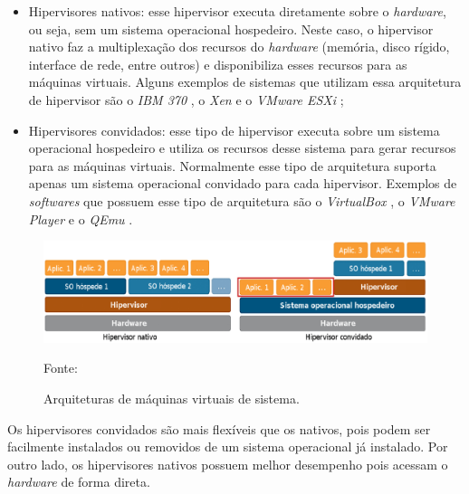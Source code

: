 \begin{itemize}
 \item Hipervisores nativos: esse hipervisor executa diretamente sobre o \textit{hardware}, ou seja, sem um sistema operacional
 hospedeiro. Neste caso, o hipervisor nativo faz a multiplexação dos recursos do \textit{hardware} (memória, disco rígido, interface de rede, 
 entre outros) e disponibiliza esses recursos para as máquinas virtuais. Alguns exemplos de sistemas que utilizam essa arquitetura de hipervisor 
 são o \textit{IBM 370} \cite{ibm370}, o \textit{Xen} \cite{xen} e o \textit{VMware ESXi} \cite{vmwareesxi};
 \item Hipervisores convidados: esse tipo de hipervisor executa sobre um sistema operacional hospedeiro e utiliza os recursos desse sistema 
 para gerar recursos para as máquinas virtuais. Normalmente esse tipo de arquitetura suporta apenas um sistema operacional convidado para cada 
 hipervisor. Exemplos de \textit{softwares} que possuem esse tipo de arquitetura são o \textit{VirtualBox} \cite{virtualbox}, 
 o \textit{VMware Player} \cite{vmwareplayer} e o \textit{QEmu} \cite{qemu}.
\end{itemize}

\begin{figure}[h!]
 \centering
 \includegraphics[width=430px]{img/vms_arquiteturas.eps}
 \caption{Arquiteturas de máquinas virtuais de sistema.}
 \label{fig:vms_arquiteturas}
 Fonte: \citet{macedo2016}
\end{figure}

Os hipervisores convidados são mais flexíveis que os nativos, pois podem ser facilmente instalados ou removidos de um sistema operacional já 
instalado. Por outro lado, os hipervisores nativos possuem melhor desempenho pois acessam o \textit{hardware} de forma direta.

